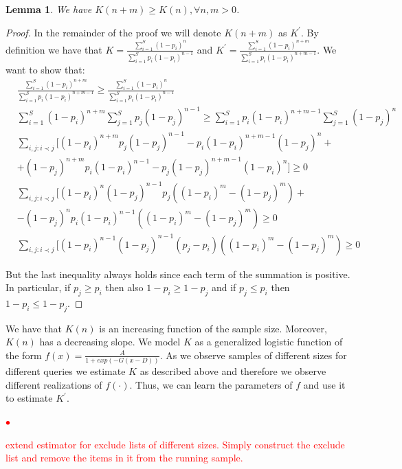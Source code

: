 \documentclass{vldb}
\newcommand{\squishlist}{
   \begin{list}{$\bullet$}
    {
      \setlength{\itemsep}{0pt}
      \setlength{\parsep}{3pt}
      \setlength{\topsep}{3pt}
      \setlength{\partopsep}{0pt}
      \setlength{\leftmargin}{1.5em}
      \setlength{\labelwidth}{1em}
      \setlength{\labelsep}{0.5em} } }
\newcommand{\squishend}{
    \end{list}  }
\newtheorem{lemma}{Lemma}
\begin{document}
\begin{lemma}
We have $K(n+m) \geq K(n), \forall n,m > 0$.
\end{lemma}
\begin{proof}
In the remainder of the proof we will denote $K(n+m)$ as $K^{\prime}$. By definition we have that $K = \frac{\sum_{i=1}^S (1-p_i)^n}{\sum_{i=1}^S p_i(1-p_i)^{n-1}}$ and $K^{\prime} = \frac{\sum_{i=1}^S (1-p_i)^{n+m}}{\sum_{i=1}^S p_i(1-p_i)^{n+m-1}}$. We want to show that:
{\small
\begin{align}
&\frac{\sum_{i=1}^S (1-p_i)^{n+m}}{\sum_{i=1}^S p_i(1-p_i)^{n+m-1}} \geq \frac{\sum_{i=1}^S (1-p_i)^n}{\sum_{i=1}^S p_i(1-p_i)^{n-1}} \nonumber \\
&\sum_{i=1}^S (1-p_i)^{n+m}\sum_{j=1}^S p_j(1-p_j)^{n-1} \geq \sum_{i=1}^S p_i(1-p_i)^{n+m-1}\sum_{j=1}^S (1-p_j)^n\nonumber \\
&\sum_{i,j:i\prec j}[(1-p_i)^{n+m}p_j(1-p_j)^{n-1} - p_i(1-p_i)^{n+m-1}(1-p_j)^n + \nonumber \\
& + (1-p_j)^{n+m}p_i(1-p_i)^{n-1} - p_j(1-p_j)^{n+m-1}(1-p_i)^n] \geq 0 \nonumber \\
&\sum_{i,j:i\prec j}[(1-p_i)^{n}(1-p_j)^{n-1}p_j((1-p_i)^{m} - (1-p_j)^{m})  + \nonumber \\
& - (1-p_j)^{n}p_i(1-p_i)^{n-1}((1-p_i)^{m} - (1-p_j)^{m}) \geq 0 \nonumber \\
&\sum_{i,j:i\prec j}[(1-p_i)^{n-1}(1-p_j)^{n-1}(p_j-p_i)((1-p_i)^{m} - (1-p_j)^{m}) \geq 0
\end{align}}

But the last inequality always holds since each term of the summation is positive. In particular, if $p_j \geq p_i$ then
also $1-p_i \geq 1-p_j$ and if $p_j \leq p_i$ then $1-p_i \leq 1-p_j$.
\end{proof}

We have that $K(n)$ is an increasing function of the sample size. Moreover, $K(n)$ has a decreasing slope. We model $K$ as a generalized logistic function of the form $f(x) = \frac{A}{1+exp(-G(x-D))}$. As we observe samples of different sizes for different queries we estimate $K$ as described above and therefore we observe different realizations of $f(\cdot)$. Thus, we can learn the parameters of $f$ and use it to estimate $K^{\prime}$.

\textcolor{red}{
\squishlist
\item extend estimator for exclude lists of different sizes. Simply construct the exclude list and remove the items in it from the running sample. 
\squishend
}
\end{document}
